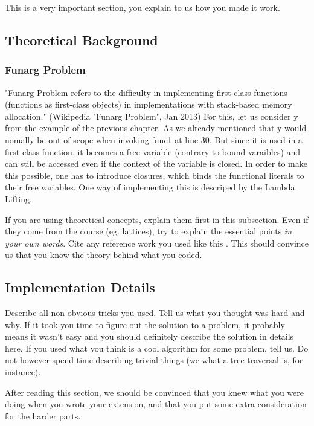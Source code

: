 This is a very important section, you explain to us how you made it work.

\subsection{Theoretical Background}

\subsubsection{Funarg Problem}
"Funarg Problem refers to the difficulty in implementing first-class functions (functions as first-class objects) in implementations with stack-based memory allocation." (Wikipedia "Funarg Problem", Jan 2013) For this, let us consider y from the example of the previous chapter. As we already mentioned that y would nomally be out of scope when invoking func1 at line 30. But since it is used in a first-class function, it becomes a free variable (contrary to bound varaibles) and can still be accessed even if the context of the variable is closed. In order to make this possible, one has to introduce closures, which binds the functional literals to their free variables. One way of implementing this is descriped by the Lambda Lifting. \newline


If you are using theoretical concepts, explain them first in this subsection.
Even if they come from the course (eg. lattices), try to explain the essential
points \emph{in your own words}. Cite any reference work you used like this
\cite{lamport94}. This should convince us that you know the theory behind what
you coded. 

\subsection{Implementation Details}
Describe all non-obvious tricks you used. Tell us what you thought was hard and
why. If it took you time to figure out the solution to a problem, it probably
means it wasn't easy and you should definitely describe the solution in details
here. If you used what you think is a cool algorithm for some problem, tell us.
Do not however spend time describing trivial things (we what a tree traversal
is, for instance). 

After reading this section, we should be convinced that you knew what you were
doing when you wrote your extension, and that you put some extra consideration
for the harder parts.

